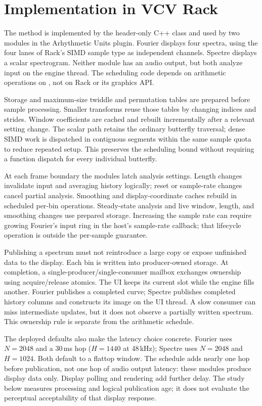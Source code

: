 \section{Implementation in VCV Rack}
\label{sec:implementation}
The method is implemented by the header-only C++ class
 and used by two modules in the Arhythmetic Units
plugin. Fourier displays four spectra, using the four lanes of Rack's SIMD
sample type as independent channels. Spectre displays a scalar spectrogram.
Neither module has an audio output, but both analyze input on the engine
thread. The scheduling code depends on arithmetic operations on ,
not on Rack or its graphics API.

Storage and maximum-size twiddle and permutation tables are prepared before
sample processing. Smaller transforms reuse those tables by changing indices
and strides. Window coefficients are cached and rebuilt incrementally after
a relevant setting change. The scalar path retains the ordinary butterfly
traversal; dense SIMD work is dispatched in contiguous segments within the
same sample quota to reduce repeated setup. This preserves the scheduling
bound without requiring a function dispatch for every individual butterfly.

At each frame boundary the modules latch analysis settings. Length changes
invalidate input and averaging history logically; reset or sample-rate changes
cancel partial analysis. Smoothing and display-coordinate caches rebuild in
scheduled per-bin operations. Steady-state analysis and live window, length,
and smoothing changes use prepared storage. Increasing the sample rate can
require growing Fourier's input ring in the host's sample-rate callback;
that lifecycle operation is outside the per-sample guarantee.

Publishing a spectrum must not reintroduce a large copy or expose unfinished
data to the display. Each bin is written into producer-owned storage. At
completion, a single-producer/single-consumer mailbox exchanges ownership using
acquire/release atomics. The UI keeps its current slot while the engine fills
another. Fourier publishes a completed curve; Spectre publishes completed
history columns and constructs its image on the UI thread. A slow consumer
can miss intermediate updates, but it does not observe a partially written
spectrum. This ownership rule is separate from the arithmetic schedule.

The deployed defaults also make the latency choice concrete. Fourier uses
$N=2048$ and a 30\,ms hop ($H=1440$ at 48\,kHz); Spectre uses $N=2048$
and $H=1024$. Both default to a flattop window. The schedule adds nearly one
hop before publication, not one hop of audio output latency: these modules
produce display data only. Display polling and rendering add further delay.
The study below measures processing and logical publication age; it does not
evaluate the perceptual acceptability of that display response.
